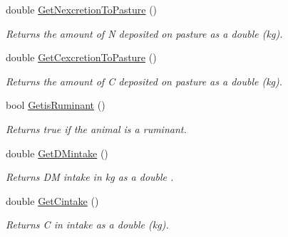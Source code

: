 \begin{DoxyCompactItemize}
\mbox{\label{classlivestock_a979d4fdafd3d30bd6047d3d27a1020e5}} 
double \mbox{\hyperlink{classlivestock_a979d4fdafd3d30bd6047d3d27a1020e5}{Get\+Nexcretion\+To\+Pasture}} ()
\begin{DoxyCompactList}\small\item\em Returns the amount of N deposited on pasture as a double (kg). \end{DoxyCompactList}\item 
\mbox{\label{classlivestock_aca22e216df3954148d343e3a552a3497}} 
double \mbox{\hyperlink{classlivestock_aca22e216df3954148d343e3a552a3497}{Get\+Cexcretion\+To\+Pasture}} ()
\begin{DoxyCompactList}\small\item\em Returns the amount of C deposited on pasture as a double (kg). \end{DoxyCompactList}\item 
\mbox{\label{classlivestock_ab8e1f9dd415c9fca45007fe6b87f02ec}} 
bool \mbox{\hyperlink{classlivestock_ab8e1f9dd415c9fca45007fe6b87f02ec}{Getis\+Ruminant}} ()
\begin{DoxyCompactList}\small\item\em Returns true if the animal is a ruminant. \end{DoxyCompactList}\item 
\mbox{\label{classlivestock_a4df46ad1b9a5b4bd3d8a70de6f84e17b}} 
double \mbox{\hyperlink{classlivestock_a4df46ad1b9a5b4bd3d8a70de6f84e17b}{Get\+D\+Mintake}} ()
\begin{DoxyCompactList}\small\item\em Returns DM intake in kg as a double . \end{DoxyCompactList}\item 
\mbox{\label{classlivestock_a316a05898f5579f7ed1f5b74655785c2}} 
double \mbox{\hyperlink{classlivestock_a316a05898f5579f7ed1f5b74655785c2}{Get\+Cintake}} ()
\begin{DoxyCompactList}\small\item\em Returns C in intake as a double (kg). \end{DoxyCompactList}\item 
\mbox{\label{classlivestock_ae354b6d283542c620c13c26d56885ceb}} 

\end{DoxyCompactItemize}
